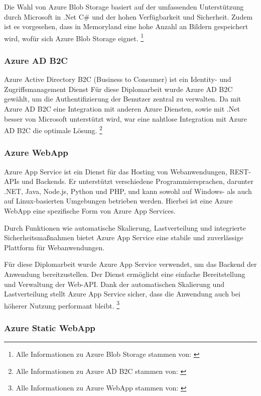 Die Wahl von Azure Blob Storage basiert auf der umfassenden Unterstützung durch Microsoft 
in .Net C\# und der hohen Verfügbarkeit und Sicherheit. Zudem ist es vorgesehen, dass in Memoryland
eine hohe Anzahl an Bildern gespeichert wird, wofür sich Azure Blob Storage eignet.
\footnote{Alle Informationen zu Azure Blob Storage stammen von: \cite{MicrosoftCorporationu}}

\subsubsection{Azure AD B2C}
\label{subsection:azure_ad_b2c}

Azure Active Directory B2C (Business to Consumer) ist ein Identity- und Zugriffsmanagement Dienst
Für diese Diplomarbeit wurde Azure AD B2C gewählt, um die Authentifizierung der Benutzer 
zentral zu verwalten. Da mit Azure AD B2C eine Integration mit anderen Azure Diensten, sowie mit
.Net besser von Microsoft unterstützt wird, war eine nahtlose Integration mit Azure AD B2C 
die optimale Lösung.
\footnote{Alle Informationen zu Azure AD B2C stammen von: \cite{MicrosoftCorporationw} \cite{MicrosoftCorporationx}}

\subsubsection{Azure WebApp}
\label{subsection:azure_web_app}

Azure App Service ist ein Dienst für das Hosting von Webanwendungen, REST-APIs und 
Backends. Er unterstützt verschiedene Programmiersprachen, darunter .NET, Java, 
Node.js, Python und PHP, und kann sowohl auf Windows- als auch auf Linux-basierten 
Umgebungen betrieben werden. Hierbei ist eine Azure WebApp eine spezifische Form
von Azure App Services.

Durch Funktionen wie automatische Skalierung, Lastverteilung und integrierte 
Sicherheitsmaßnahmen bietet Azure App Service eine stabile und zuverlässige 
Plattform für Webanwendungen.

Für diese Diplomarbeit wurde Azure App Service verwendet, um das Backend der 
Anwendung bereitzustellen. Der Dienst ermöglicht eine einfache Bereitstellung 
und Verwaltung der Web-API. Dank der automatischen Skalierung und Lastverteilung 
stellt Azure App Service sicher, dass die Anwendung auch bei höherer Nutzung 
performant bleibt.
\footnote{Alle Informationen zu Azure WebApp stammen von: \cite{MicrosoftCorporationy}}

\subsubsection{Azure Static WebApp}
\label{subsection:azure_static_web_app}

